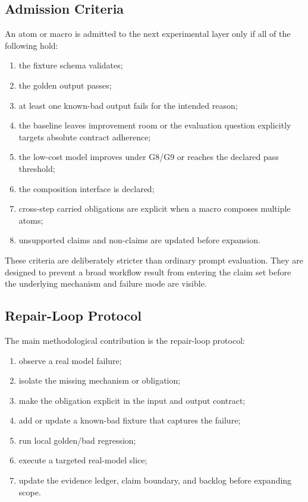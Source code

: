 \documentclass[11pt]{article}
\begin{document}
\subsection{Admission Criteria}

An atom or macro is admitted to the next experimental layer only if all of the following hold:

\begin{enumerate}
\item the fixture schema validates;
\item the golden output passes;
\item at least one known-bad output fails for the intended reason;
\item the baseline leaves improvement room or the evaluation question explicitly targets absolute contract adherence;
\item the low-cost model improves under G8/G9 or reaches the declared pass threshold;
\item the composition interface is declared;
\item cross-step carried obligations are explicit when a macro composes multiple atoms;
\item unsupported claims and non-claims are updated before expansion.
\end{enumerate}

These criteria are deliberately stricter than ordinary prompt evaluation. They are designed to prevent a broad workflow result from entering the claim set before the underlying mechanism and failure mode are visible.

\subsection{Repair-Loop Protocol}

The main methodological contribution is the repair-loop protocol:

\begin{enumerate}
\item observe a real model failure;
\item isolate the missing mechanism or obligation;
\item make the obligation explicit in the input and output contract;
\item add or update a known-bad fixture that captures the failure;
\item run local golden/bad regression;
\item execute a targeted real-model slice;
\item update the evidence ledger, claim boundary, and backlog before expanding scope.
\end{enumerate}
\end{document}
